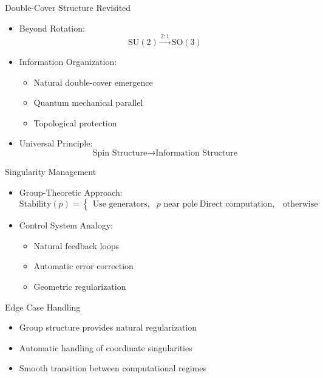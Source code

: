 \documentclass{beamer}
\begin{document}
\begin{frame}{Double-Cover Structure Revisited}
\begin{itemize}
\item Beyond Rotation:
\begin{equation*}
\text{SU}(2) \xrightarrow{2:1} \text{SO}(3)
\end{equation*}
\item Information Organization:
\begin{itemize}
\item Natural double-cover emergence
\item Quantum mechanical parallel
\item Topological protection
\end{itemize}
\pause
\item Universal Principle:
\begin{equation*}
\text{Spin Structure} \rightarrow \text{Information Structure}
\end{equation*}
\end{itemize}
\end{frame}
\begin{frame}{Singularity Management}
\begin{itemize}
\item Group-Theoretic Approach:
\begin{equation*}
\text{Stability}(p) = \begin{cases}
\text{Use generators}, & p \text{ near pole} \
\text{Direct computation}, & \text{otherwise}
\end{cases}
\end{equation*}
\pause
\item Control System Analogy:
\begin{itemize}
\item Natural feedback loops
\item Automatic error correction
\item Geometric regularization
\end{itemize}
\end{itemize}
\end{frame}
\begin{frame}{Edge Case Handling}
\begin{center}
\end{center}
\begin{itemize}
\item Group structure provides natural regularization
\item Automatic handling of coordinate singularities
\item Smooth transition between computational regimes
\end{itemize}
\end{frame}
\end{document}
